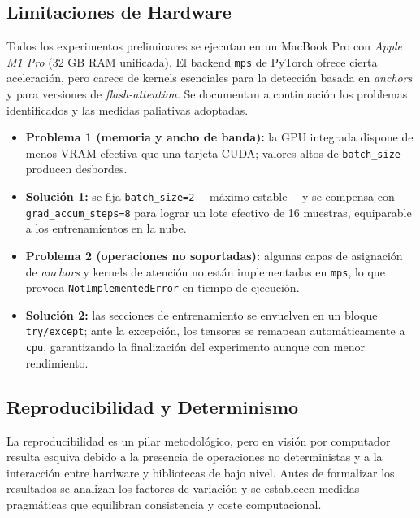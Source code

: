 \subsection{Limitaciones de Hardware}\label{ssec:hw_local}

Todos los experimentos preliminares se ejecutan en un MacBook Pro con \textit{Apple M1 Pro} (32 GB RAM unificada).
El backend \texttt{mps} de PyTorch ofrece cierta aceleración, pero carece de kernels esenciales para la detección basada en \emph{anchors} y para versiones de \emph{flash-attention}.
Se documentan a continuación los problemas identificados y las medidas paliativas adoptadas.

\begin{itemize}
   \item \textbf{Problema 1 (memoria y ancho de banda):} la GPU integrada dispone de menos VRAM efectiva que una tarjeta \textsc{CUDA}; valores altos de \texttt{batch\_size} producen desbordes.
   \item \textbf{Solución 1:} se fija \texttt{batch\_size=2} —máximo estable— y se compensa con \texttt{grad\_accum\_steps=8} para lograr un lote efectivo de 16 muestras, equiparable a los entrenamientos en la nube.
   \item \textbf{Problema 2 (operaciones no soportadas):} algunas capas de asignación de \emph{anchors} y kernels de atención no están implementadas en \texttt{mps}, lo que provoca \texttt{NotImplementedError} en tiempo de ejecución.
   \item \textbf{Solución 2:} las secciones de entrenamiento se envuelven en un bloque \texttt{try/except}; ante la excepción, los tensores se remapean automáticamente a \texttt{cpu}, garantizando la finalización del experimento aunque con menor rendimiento.
\end{itemize}

\subsection{Reproducibilidad y Determinismo}

La reproducibilidad es un pilar metodológico, pero en visión por computador resulta esquiva debido a la presencia de operaciones no deterministas y a la interacción entre hardware y bibliotecas de bajo nivel.
Antes de formalizar los resultados se analizan los factores de variación y se establecen medidas pragmáticas que equilibran consistencia y coste computacional.

